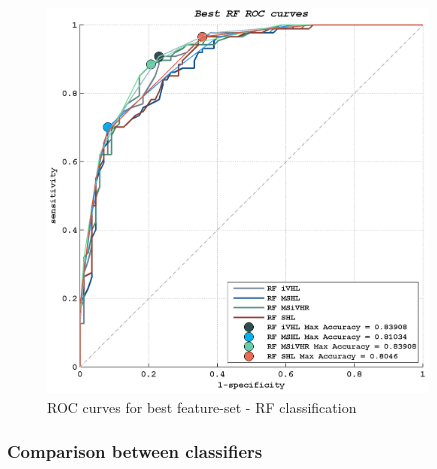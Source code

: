 
\begin{figure}[!htb]
      \includegraphics[width=0.90\textwidth]{./images/Ch6/Fig6//RF_ROC_best_crop.png}
    \caption{ROC curves for best feature-set - RF classification}
    \label{ch6:fig7}
\end{figure}



\clearpage

\subsubsection{Comparison between classifiers}

